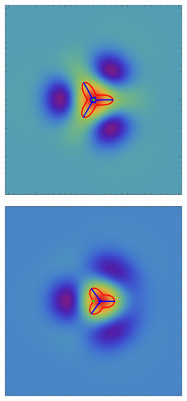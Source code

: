 \documentclass[a4paper, 11pt]{article}
\begin{document}
\begin{figure}
\begin{subfigure}[b]{0.24\textwidth}
\end{subfigure}
\begin{subfigure}[b]{0.24\textwidth}
\includegraphics[width=\textwidth]{Elliptic_mean_delta}
\end{subfigure}
\begin{subfigure}[b]{0.24\textwidth}
\includegraphics[width=\textwidth]{Hyperbolic_mean_delta}

\end{subfigure}
\end{figure}
\end{document}
